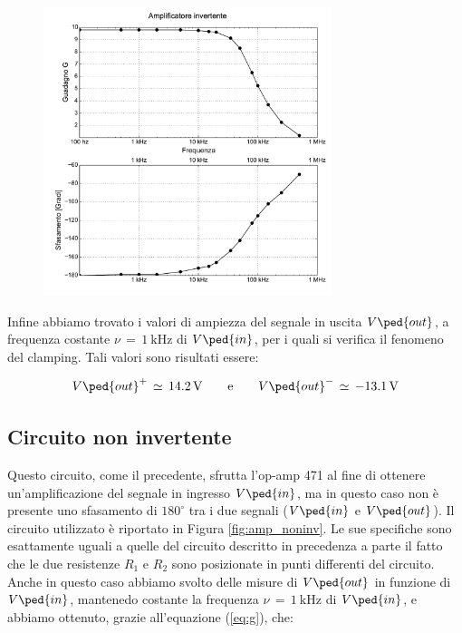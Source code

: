 \begin{figure}
    \includegraphics[width=0.75\textwidth]{amp_inv.pdf}
    \label{fig:g_vs_frequenza}
\end{figure}

Infine abbiamo trovato i valori di ampiezza del segnale in uscita $V\ped{out}$, a frequenza costante $\nu\,=\,\SI{1}{\kilo\hertz}$ di $V\ped{in}$, per i quali si verifica il fenomeno del clamping. Tali valori sono risultati essere:

\begin{equation}
        V\ped{out}^+\,\simeq\,\SI{14.2}{\volt} \qquad \text{e} \qquad V\ped{out}^-\,\simeq\,\SI{-13.1}{\volt}
\end{equation}

\subsection*{Circuito non invertente}

Questo circuito, come il precedente, sfrutta l'op-amp 471 al fine di ottenere un'amplificazione del segnale in ingresso $V\ped{in}$, ma in questo caso non è presente uno sfasamento di $180^\circ$ tra i due segnali ($V\ped{in}$ e $V\ped{out}$).
Il circuito utilizzato è riportato in Figura \ref{fig:amp_noninv}. Le sue specifiche sono esattamente uguali a quelle del circuito descritto in precedenza a parte il fatto che le due resistenze $R_1$ e $R_2$ sono posizionate in punti differenti del circuito.
Anche in questo caso abbiamo svolto delle misure di $V\ped{out}$ in funzione di $V\ped{in}$, mantenedo costante la frequenza $\nu\,=\,\SI{1}{\kilo\hertz}$ di $V\ped{in}$, e abbiamo ottenuto, grazie all'equazione (\ref{eq:g}), che:

